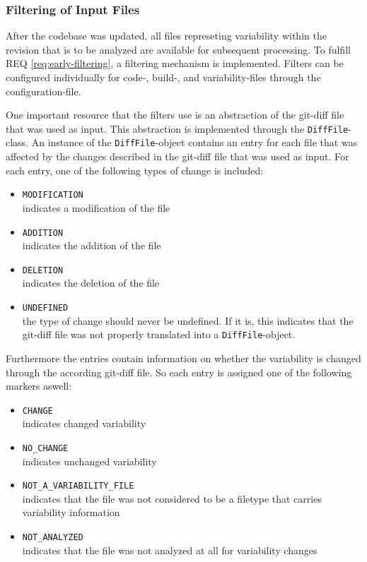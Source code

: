 \documentclass[a4paper]{article}
\begin{document}
\subsubsection{Filtering of Input Files}\label{filtering-input}

After the codebase was updated, all files represeting variability within the revision that is to be analyzed are available for subsequent processing. To fulfill REQ \ref{req:early-filtering}, a filtering mechanism is implemented. Filters can be configured individually for code-, build-, and variability-files through the configuration-file.

One important resource that the filters use is an abstraction of the git-diff file that was used as input. This abstraction is implemented through the \texttt{DiffFile}-class.
An instance of the \texttt{DiffFile}-object contains an entry for each file that was affected by the changes described in the git-diff file that was used as input. For each entry, one of the following types of change is included:

\begin{itemize}
	\item \texttt{MODIFICATION} \\
	      indicates a modification of the file
	\item \texttt{ADDITION} \\
	      indicates the addition of the file
	\item \texttt{DELETION} \\
	      indicates the deletion of the file 
	\item \texttt{UNDEFINED} \\
	      the type of change should never be undefined. If it is, this indicates that the git-diff file was not properly translated into a \texttt{DiffFile}-object.
\end{itemize}

Furthermore the entries contain information on whether the variability is changed through the according git-diff file. So each entry is assigned one of the following markers aswell:

\begin{itemize}
	\item \texttt{CHANGE} \\
	      indicates changed variability
	\item \texttt{NO\_CHANGE} \\
	      indicates unchanged variability
	\item \texttt{NOT\_A\_VARIABILITY\_FILE}\\
	      indicates that the file was not considered to be a filetype that carries variability information
	\item \texttt{NOT\_ANALYZED}\\
	      indicates that the file was not analyzed at all for variability changes
\end{itemize}
\end{document}
